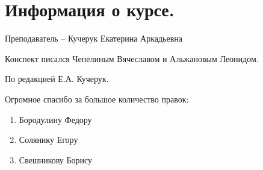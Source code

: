 \chapter{Информация о курсе.}

Преподаватель -- Кучерук Екатерина Аркадьевна

Конспект писался Чепелиным Вячеславом и Альжановым Леонидом. 

По редакцией Е.А. Кучерук.

Огромное спасибо за большое количество правок:

\begin{enumerate}
    \item Бородулину Федору 
    \item Солянику Егору 
    \item Свешникову Борису
\end{enumerate}